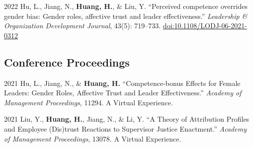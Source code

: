 \documentclass[11pt,letterpaper]{report} %
\begin{document}
    \begin{tablist}

        \item[2022] \tab{}Hu, L., Jiang, N., \textbf{Huang, H.}, \& Liu, Y. \enquote{Perceived competence overrides gender bias: Gender roles, affective trust and leader effectiveness.} \textit{Leadership \& Organization Development Journal}, 43(5): 719--733. \href{https://doi.org/10.1108/LODJ-06-2021-0312}{doi:10.1108/LODJ-06-2021-0312}

    \end{tablist}









    \subsection*{Conference Proceedings}

    \begin{tablist}

        \item[2021] \tab{}Hu, L., Jiang, N., \& \textbf{Huang, H.} \enquote{Competence-bonus Effects for Female Leaders: Gender Roles, Affective Trust and Leader Effectiveness.} \textit{Academy of Management Proceedings}, 11294. A Virtual Experience.

        \item[2021] \tab{}Liu, Y., \textbf{Huang, H.}, Jiang, N., \& Li, Y. \enquote{A Theory of Attribution Profiles and Employee (Dis)trust Reactions to Supervisor Justice Enactment.} \textit{Academy of Management Proceedings}, 13078. A Virtual Experience.


    \end{tablist}
\end{document}
